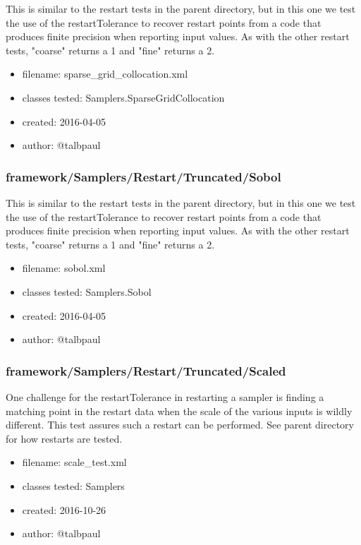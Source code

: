       This is similar to the restart tests in the parent directory, but in this one we test the use of the
      restartTolerance to recover restart points from a code that produces finite precision when reporting input
      values.  As with the other restart tests, "coarse" returns a 1 and "fine" returns a 2.
    
      \begin{itemize}
          \item filename: sparse\_grid\_collocation.xml
          \item classes tested: Samplers.SparseGridCollocation
          \item created: 2016-04-05
          \item author: @talbpaul
      \end{itemize}
    \subsubsection{framework/Samplers/Restart/Truncated/Sobol}
      
      This is similar to the restart tests in the parent directory, but in this one we test the use of the
      restartTolerance to recover restart points from a code that produces finite precision when reporting input
      values.  As with the other restart tests, "coarse" returns a 1 and "fine" returns a 2.
    
      \begin{itemize}
          \item filename: sobol.xml
          \item classes tested: Samplers.Sobol
          \item created: 2016-04-05
          \item author: @talbpaul
      \end{itemize}
    \subsubsection{framework/Samplers/Restart/Truncated/Scaled}
      
      One challenge for the restartTolerance in restarting a sampler is finding a matching point in the restart data
      when the scale of the various inputs is wildly different.  This test assures such a restart can be performed.
      See parent directory for how restarts are tested.
    
      \begin{itemize}
          \item filename: scale\_test.xml
          \item classes tested: Samplers
          \item created: 2016-10-26
          \item author: @talbpaul
      \end{itemize}
